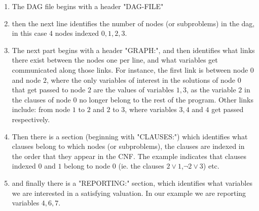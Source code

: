 \documentclass[
10pt, %
a4paper, %
oneside, %
headinclude,footinclude, %
BCOR5mm, %
]{scrartcl}
\begin{document}
\begin{enumerate}[noitemsep]
\item	The DAG file begins with a header "DAG-FILE"
\item	then the next line identifies the number of nodes (or subproblems) in the dag, in this case 4 nodes indexed $0,1,2,3$.
\item	The next part begins with a header "GRAPH:", and then identifies what links there exist between the nodes one per line, and what variables get communicated along those links.
For instance, the first link is between node $0$ and node $2$, where the only variables of interest in the solutions of node $0$ that get passed to node $2$ are the values of variables $1,3$,
as the variable $2$ in the clauses of node $0$ no longer belong to the rest of the program.
Other links include: from node $1$ to $2$ and $2$ to $3$, where variables $3,4$ and $4$ get passed respectively.
\item	Then there is a section (beginning with "CLAUSES:") which identifies what clauses belong to which nodes (or subproblems), the clauses are indexed in the order that they appear in the CNF.
The example indicates that clauses indexed $0$ and $1$ belong to node $0$ (ie. the clauses $2\lor 1$,$\neg 2\lor 3$) etc. 
\item	and finally there is a "REPORTING:" section, which identifies what variables we are interested in a satisfying valuation. In our example we are reporting variables $4,6,7$. 
\end{enumerate}
\end{document}
